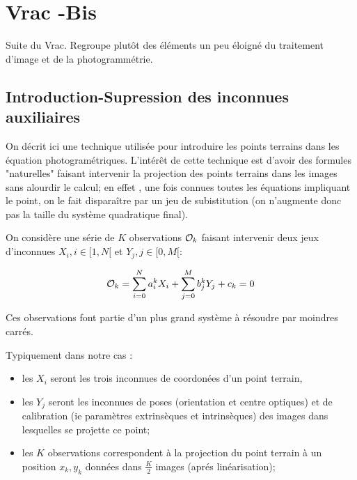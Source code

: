 \chapter{Vrac -Bis }

Suite du Vrac. Regroupe plut\^ot des \'el\'ements un peu 
\'eloign\'e du traitement d'image et de la photogramm\'etrie.


\section{Introduction-Supression des inconnues auxiliaires}

On d\'ecrit ici une technique utilis\'ee pour introduire les
points terrains dans les \'equation photogram\'etriques. L'int\'er\^et
de cette technique est d'avoir des formules "naturelles"
faisant intervenir la projection des points terrains dans
les images sans alourdir le calcul; en effet , une fois connues
toutes les \'equations impliquant le point, on le fait 
dispara\^itre par un jeu de subistitution (on n'augmente
donc pas la taille du syst\`eme quadratique final).

On consid\`ere une s\'erie de $K$ observations $\Ok$ faisant
intervenir deux jeux d'inconnues $X_i, i \in [1,N[$ et $Y_j, j \in [0,M[$:

\begin{equation}
   \Ok = \sum_{i=0}^N a^k_i X_i + \sum_{j=0}^M b^k_j Y_j + c_k = 0
\end{equation}

Ces observations font partie d'un plus grand syst\`eme \`a r\'esoudre
par moindres carr\'es.

Typiquement dans notre cas :

\begin{itemize}
    \item   les $X_i$ seront les trois inconnues de coordon\'ees
            d'un point terrain,   

     \item   les  $Y_j$ seront les inconnues de poses
             (orientation et centre optiques) et de calibration
	     (ie param\`etres extrins\`eques et intrins\`eques) des
	     images dans lesquelles se projette ce point;

     \item les $K$ observations correspondent \`a la projection du 
           point terrain \`a un position $x_k,y_k$ donn\'ees 
	   dans $\frac{K}{2}$  images (apr\'es lin\'earisation);

\end{itemize}

